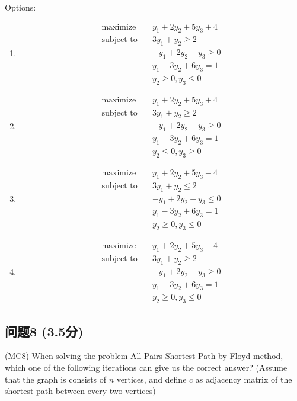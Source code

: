\documentclass[11pt, a4paper]{article}
\begin{document}
Options:
\begin{enumerate}[label=\arabic*., leftmargin=*]
    \item \begin{align*}
        \text{maximize} \quad & y_1 + 2y_2 + 5y_3 + 4 \\
        \text{subject to} \quad & 3y_1 + y_2 \geq 2 \\
        & -y_1 + 2y_2 + y_3 \geq 0 \\
        & y_1 - 3y_2 + 6y_3 = 1 \\
        & y_2 \geq 0, y_3 \leq 0
    \end{align*}
    \item \begin{align*}
        \text{maximize} \quad & y_1 + 2y_2 + 5y_3 + 4 \\
        \text{subject to} \quad & 3y_1 + y_2 \geq 2 \\
        & -y_1 + 2y_2 + y_3 \geq 0 \\
        & y_1 - 3y_2 + 6y_3 = 1 \\
        & y_2 \leq 0, y_3 \geq 0
    \end{align*}
    \item \begin{align*}
        \text{maximize} \quad & y_1 + 2y_2 + 5y_3 - 4 \\
        \text{subject to} \quad & 3y_1 + y_2 \leq 2 \\
        & -y_1 + 2y_2 + y_3 \leq 0 \\
        & y_1 - 3y_2 + 6y_3 = 1 \\
        & y_2 \geq 0, y_3 \leq 0
    \end{align*}
    \item \begin{align*}
        \text{maximize} \quad & y_1 + 2y_2 + 5y_3 - 4 \\
        \text{subject to} \quad & 3y_1 + y_2 \geq 2 \\
        & -y_1 + 2y_2 + y_3 \geq 0 \\
        & y_1 - 3y_2 + 6y_3 = 1 \\
        & y_2 \geq 0, y_3 \leq 0
    \end{align*}
\end{enumerate}

\subsection*{问题8 (3.5分)}
(MC8) When solving the problem All-Pairs Shortest Path by Floyd method, which one of the following iterations can give us the correct answer? (Assume that the graph is consists of \(n\) vertices, and define \(c\) as adjacency matrix of the shortest path between every two vertices)
\end{document}
